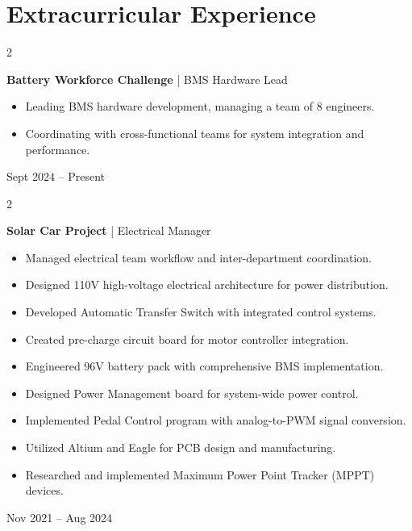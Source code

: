 \documentclass[10pt, letterpaper]{article}
\newenvironment{highlights}{
    \begin{itemize}[
        topsep=0.10 cm,
        parsep=0.10 cm,
        partopsep=0pt,
        itemsep=0pt,
        leftmargin=0.4 cm + 10pt
    ]
}{
    \end{itemize}
} %
\newenvironment{twocolentry}[2][]{
    \onecolentry
    \def\secondColumn{#2}
    \setcolumnwidth{\fill, 4.5 cm}
    \begin{paracol}{2}
}{
    \switchcolumn \raggedleft \secondColumn
    \end{paracol}
    \endonecolentry
} %
\begin{document}
    \section{Extracurricular Experience}
        \begin{twocolentry}{Sept 2024 – Present}
            \textbf{Battery Workforce Challenge} | BMS Hardware Lead
            \begin{highlights}
                \item Leading BMS hardware development, managing a team of 8 engineers.
                \item Coordinating with cross-functional teams for system integration and performance.
            \end{highlights}
        \end{twocolentry}

        \begin{twocolentry}{Nov 2021 – Aug 2024}
            \textbf{Solar Car Project} | Electrical Manager
            \begin{highlights}
                \item Managed electrical team workflow and inter-department coordination.
                \item Designed 110V high-voltage electrical architecture for power distribution.
                \item Developed Automatic Transfer Switch with integrated control systems.
                \item Created pre-charge circuit board for motor controller integration.
                \item Engineered 96V battery pack with comprehensive BMS implementation.
                \item Designed Power Management board for system-wide power control.
                \item Implemented Pedal Control program with analog-to-PWM signal conversion.
                \item Utilized Altium and Eagle for PCB design and manufacturing.
                \item Researched and implemented Maximum Power Point Tracker (MPPT) devices.
            \end{highlights}
        \end{twocolentry}
\end{document}
